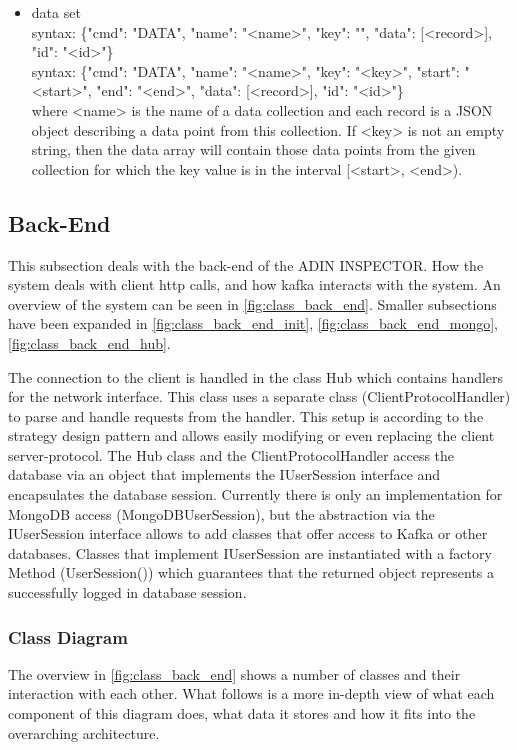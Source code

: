 \documentclass[oneside, english, final]{design}
\begin{document}
\begin{itemize}
	\item{data set}
	      \\
	      syntax: \{"cmd": "DATA", "name": "<name>", "key": "", "data": [<record>], "id": "<id>"\} \\
	      syntax: \{"cmd": "DATA", "name": "<name>", "key": "<key>", "start": "<start>", "end": "<end>", "data": [<record>], "id": "<id>"\} \\
	      where <name> is the name of a data collection and each record is a JSON object describing a data point from this collection. If <key> is not an empty string, then the data array will contain those data points from the given collection for which the key value is in the interval [<start>, <end>).
\end{itemize}

\subsection{Back-End}
This subsection deals with the back-end of the ADIN INSPECTOR. How the system deals with client http calls, and how kafka interacts with the system.
An overview of the system can be seen in \autoref{fig:class_back_end}. Smaller subsections have been expanded in \autoref{fig:class_back_end_init}, \autoref{fig:class_back_end_mongo}, \autoref{fig:class_back_end_hub}.

The connection to the client is handled in the class Hub which contains handlers for the network interface. This class uses a separate class (ClientProtocolHandler) to parse and handle requests from the handler. This setup is according to the strategy design pattern and allows easily modifying or even replacing the client server-protocol.
The Hub class and the ClientProtocolHandler access the database via an object that implements the IUserSession interface and encapsulates the database session. Currently there is only an implementation for MongoDB access (MongoDBUserSession), but the abstraction via the IUserSession interface allows to add classes that offer access to Kafka or other databases.
Classes that implement IUserSession are instantiated with a factory Method (UserSession()) which guarantees that the returned object represents a successfully logged in database session.


\subsubsection{Class Diagram}
The overview in  \autoref{fig:class_back_end} shows a number of classes and their interaction with each other. What follows is a more in-depth view of what each component of this diagram does, what data it stores and how it fits into the overarching architecture.
\end{document}
